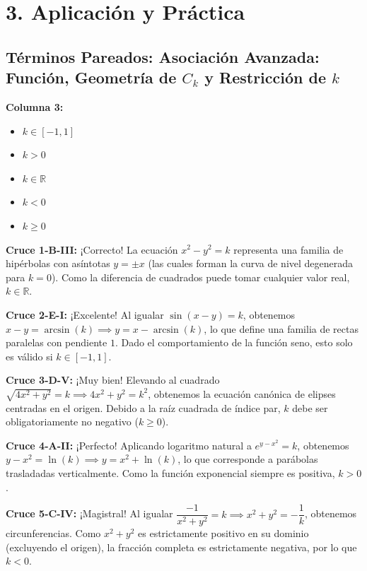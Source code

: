\documentclass[11pt]{article}
\newenvironment{aplicacion}{%
  \section*{3. Aplicación y Práctica}%
}{}
\newenvironment{pareadostrescolumnas}[1]{\subsection*{Términos Pareados: #1}}{\vspace{0.3cm}}
\newcommand{\columnaIII}[1]{\textbf{Columna 3:}\begin{itemize}#1\end{itemize}}
\newcommand{\pareotres}[2]{\textbf{Cruce #1:} #2\par}
\begin{document}
\begin{aplicacion}
\begin{pareadostrescolumnas}{Asociación Avanzada: Función, Geometría de $C_k$ y Restricción de $k$}
    \columnaIII{
      \item $k \in [-1, 1]$
      \item $k > 0$
      \item $k \in \mathbb{R}$
      \item $k < 0$
      \item $k \geq 0$
    }

    \pareotres{1-B-III}{¡Correcto! La ecuación $x^2 - y^2 = k$ representa una familia de hipérbolas con asíntotas $y = \pm x$ (las cuales forman la curva de nivel degenerada para $k=0$). Como la diferencia de cuadrados puede tomar cualquier valor real, $k \in \mathbb{R}$.}
    \pareotres{2-E-I}{¡Excelente! Al igualar $\sin(x-y) = k$, obtenemos $x-y = \arcsin(k) \implies y = x - \arcsin(k)$, lo que define una familia de rectas paralelas con pendiente $1$. Dado el comportamiento de la función seno, esto solo es válido si $k \in [-1, 1]$.}
    \pareotres{3-D-V}{¡Muy bien! Elevando al cuadrado $\sqrt{4x^2 + y^2} = k \implies 4x^2 + y^2 = k^2$, obtenemos la ecuación canónica de elipses centradas en el origen. Debido a la raíz cuadrada de índice par, $k$ debe ser obligatoriamente no negativo ($k \geq 0$).}
    \pareotres{4-A-II}{¡Perfecto! Aplicando logaritmo natural a $e^{y - x^2} = k$, obtenemos $y - x^2 = \ln(k) \implies y = x^2 + \ln(k)$, lo que corresponde a parábolas trasladadas verticalmente. Como la función exponencial siempre es positiva, $k > 0$.}
    \pareotres{5-C-IV}{¡Magistral! Al igualar $\dfrac{-1}{x^2 + y^2} = k \implies x^2 + y^2 = -\dfrac{1}{k}$, obtenemos circunferencias. Como $x^2 + y^2$ es estrictamente positivo en su dominio (excluyendo el origen), la fracción completa es estrictamente negativa, por lo que $k < 0$.}

  \end{pareadostrescolumnas}

\end{aplicacion}
\end{document}

